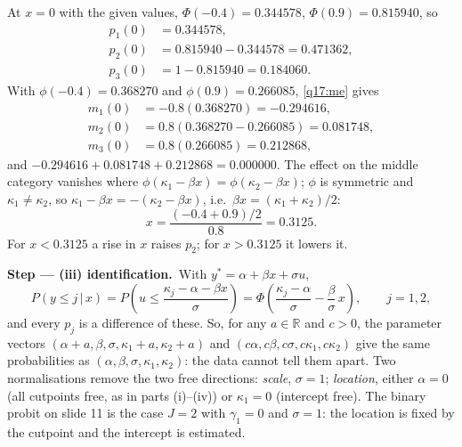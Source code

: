 \documentclass[11pt,a4paper]{article}
\numberwithin{equation}{questao}
\newcommand{\passo}[2]{\par\smallskip\noindent\textbf{Step --- #1.}~#2}
\begin{document}
\begin{sol}
{At $x=0$ with the given values, $\Phi(-0.4)=0.344578$, $\Phi(0.9)=0.815940$, so
\begin{align*}
p_1(0)&=0.344578,\\
p_2(0)&=0.815940-0.344578=0.471362,\\
p_3(0)&=1-0.815940=0.184060.
\end{align*}
With $\phi(-0.4)=0.368270$ and $\phi(0.9)=0.266085$, \eqref{q17:me} gives
\begin{align*}
m_1(0)&=-0.8(0.368270)=-0.294616,\\
m_2(0)&=0.8(0.368270-0.266085)=0.081748,\\
m_3(0)&=0.8(0.266085)=0.212868,
\end{align*}
and $-0.294616+0.081748+0.212868=0.000000$. The effect on the middle category vanishes where
$\phi(\kappa_1-\beta x)=\phi(\kappa_2-\beta x)$; $\phi$ is symmetric and $\kappa_1\ne\kappa_2$, so
$\kappa_1-\beta x=-(\kappa_2-\beta x)$, i.e.\ $\beta x=(\kappa_1+\kappa_2)/2$:
\begin{equation*}
x=\frac{(-0.4+0.9)/2}{0.8}=0.3125 .
\end{equation*}
For $x<0.3125$ a rise in $x$ raises $p_2$; for $x>0.3125$ it lowers it.}

\passo{(iii) identification}{With $y^*=\alpha+\beta x+\sigma u$,
\begin{equation*}
P(y\le j\,|\,x)=P\!\left(u\le\frac{\kappa_j-\alpha-\beta x}{\sigma}\right)=\Phi\!\left(\frac{\kappa_j-\alpha}{\sigma}-\frac{\beta}{\sigma}\,x\right),\qquad j=1,2,
\end{equation*}
and every $p_j$ is a difference of these. So, for any $a\in\mathbb{R}$ and $c>0$, the parameter vectors
$(\alpha+a,\beta,\sigma,\kappa_1+a,\kappa_2+a)$ and $(c\alpha,c\beta,c\sigma,c\kappa_1,c\kappa_2)$ give the same probabilities as
$(\alpha,\beta,\sigma,\kappa_1,\kappa_2)$: the data cannot tell them apart. Two
normalisations remove the two free directions: \emph{scale}, $\sigma=1$; \emph{location}, either $\alpha=0$ (all cutpoints
free, as in parts (i)--(iv)) or $\kappa_1=0$ (intercept free). The binary probit on slide 11 is the case $J=2$ with
$\gamma_1=0$ and $\sigma=1$: the location is fixed by the cutpoint and the intercept is estimated.}


\end{sol}
\end{document}

